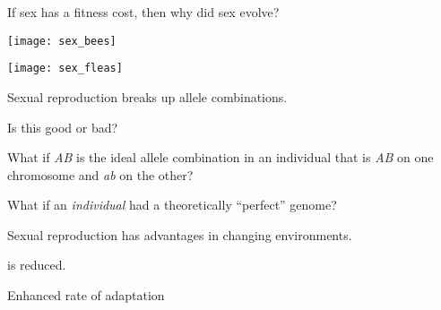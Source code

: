 \documentclass[t]{beamer}
\begin{document}

\begin{frame}{If sex has a fitness cost, then why did sex evolve?}
\vspace{-\baselineskip}

\begin{multicols}{2}

\centering


\smallskip

\texttt{[image: sex\_bees]}

\columnbreak


\smallskip

\texttt{[image: sex\_fleas]}

\end{multicols}
\end{frame}


\begin{frame}{Sexual reproduction breaks up allele combinations.}

\hangpara Is this good or bad?

\hangpara What if \emph{AB} is the ideal allele combination in an individual that is \emph{AB} on one chromosome and \emph{ab} on the other?

\hangpara What if an \emph{individual} had a theoretically “perfect” genome? 


\end{frame}


\begin{frame}{Sexual reproduction has advantages in changing environments.}

\hangpara {}

\hangpara {} is reduced.\newline
	\hspace*{1em} \newline
	\hspace*{1em}  \newline
	\hspace*{1em} 
	
\hangpara Enhanced rate of adaptation

\end{frame}
\end{document}
